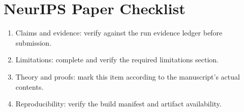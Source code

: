 \documentclass{article}
\begin{document}



\section*{NeurIPS Paper Checklist}
\begin{enumerate}
  \item Claims and evidence: verify against the run evidence ledger before submission.
  \item Limitations: complete and verify the required limitations section.
  \item Theory and proofs: mark this item according to the manuscript's actual contents.
  \item Reproducibility: verify the build manifest and artifact availability.
\end{enumerate}
\end{document}
